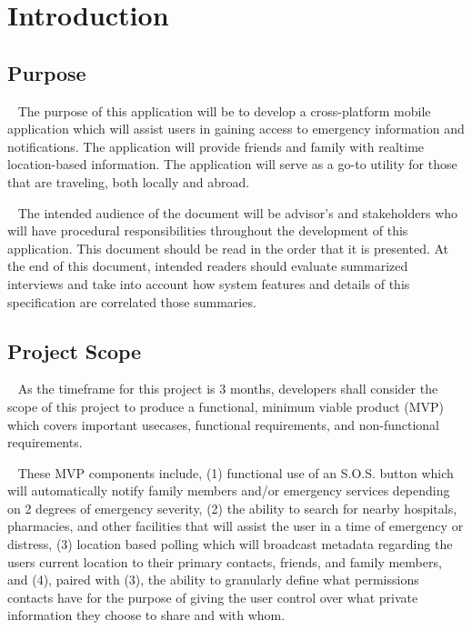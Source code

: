 \documentclass{scrreprt}
\begin{document}
\chapter{Introduction}


\section{Purpose}
\par ~ The purpose of this application will be to develop a cross-platform mobile application which will assist users in gaining access to emergency information and notifications. The application will provide friends and family with realtime location-based information. The application will serve as a go-to utility for those that are traveling, both locally and abroad.
\par ~ The intended audience of the document will be advisor's and stakeholders who will have procedural responsibilities throughout the development of this application. This document should be read in the order that it is presented. At the end of this document, intended readers should evaluate summarized interviews and take into account how system features and details of this specification are correlated those summaries.


\section{Project Scope}
\par ~ As the timeframe for this project is 3 months, developers shall consider the scope of this project to produce a functional, minimum viable product (MVP) which covers important usecases, functional requirements, and non-functional requirements. 

\par ~ These MVP components include, (1) functional use of an S.O.S. button which will automatically notify family members and/or emergency services depending on 2 degrees of emergency severity, (2) the ability to search for nearby hospitals, pharmacies, and other facilities that will assist the user in a time of emergency or distress, (3) location based polling which will broadcast metadata regarding the users current location to their primary contacts, friends, and family members, and (4), paired with (3), the ability to granularly define what permissions contacts have for the purpose of giving the user control over what private information they choose to share and with whom.
\end{document}
